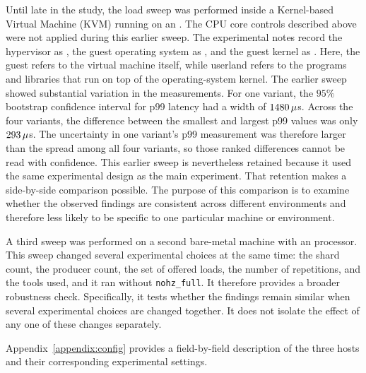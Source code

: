 \documentclass[english,oneside,a4paper,censored,csm,software-track-2020]{HYthesisML}
\begin{document}
Until late in the study, the load sweep was performed inside a
Kernel-based Virtual Machine (KVM) running on an \GuestCpu{}. The CPU core
controls described above were not applied during this earlier sweep. The
experimental notes record the hypervisor as \GuestVirt{}, the guest
operating system as \GuestDistro{}, and the guest kernel as \GuestKernel{}.
Here, the guest refers to the virtual machine itself, while userland refers
to the programs and libraries that run on top of the operating-system
kernel. The earlier sweep showed substantial variation in the measurements. For one
variant, the $95\%$ bootstrap confidence interval for p99 latency had a
width of $1480\,\mu$s. Across the four variants, the
difference between the smallest and largest p99 values was only
$293\,\mu$s. The uncertainty in one variant's p99 measurement was
therefore larger than the spread among all four variants, so those ranked differences
cannot be read with confidence. This earlier sweep is nevertheless retained because it used the same
experimental design as the main experiment. That retention makes a
side-by-side comparison possible. The purpose of this comparison is to examine
whether the observed findings are consistent across different environments
and therefore less likely to be specific to one particular machine or
environment.

A third sweep was performed on a second bare-metal machine with an
\BmCpu{} processor. This sweep changed several experimental choices at
the same time: the shard count, the producer count, the set of offered loads,
the number of repetitions, and the tools used, and it ran without
\texttt{nohz\_full}. It therefore provides a broader
robustness check. Specifically, it tests whether the findings remain
similar when several experimental choices are changed together. It does
not isolate the effect of any one of these changes
separately.

Appendix~\ref{appendix:config} provides a field-by-field description of
the three hosts and their corresponding experimental settings.
\end{document}
